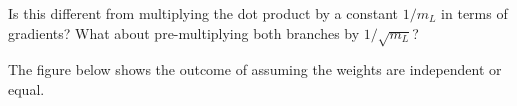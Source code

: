 Is this different from multiplying the dot product by a constant $1 / m_{L}$ in terms of gradients?
What about pre-multiplying both branches by $1 / \sqrt{m_L}$?




The figure below shows the outcome of assuming the weights are independent or equal.

